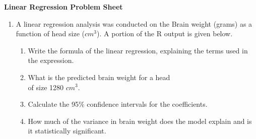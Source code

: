 \documentclass[a4paper,12pt]{article}
\theoremstyle{Qstyle}
\begin{document}
	\thispagestyle{empty}
	\begin{center}
	\Large{\bf{ Linear Regression Problem Sheet}}
	\end{center}
	\begin{enumerate}
		
		\item 
		
		A linear regression analysis was conducted on the Brain weight (grams) as a function of head size ($cm^3$). A portion of the R output is given below.\\
		\noindent{}
		
		\begin{enumerate}
			\item Write the formula of the linear regression, explaining the terms used in the expression.
			\item What is the predicted brain weight for a head\\ of size 1280 $cm^3$. 
			\item Calculate the 95\% confidence intervals for the coefficients.
			\item How much of the variance in brain weight does the model explain and is it statistically significant.
			

\end{enumerate}
\end{enumerate}
\end{document}
